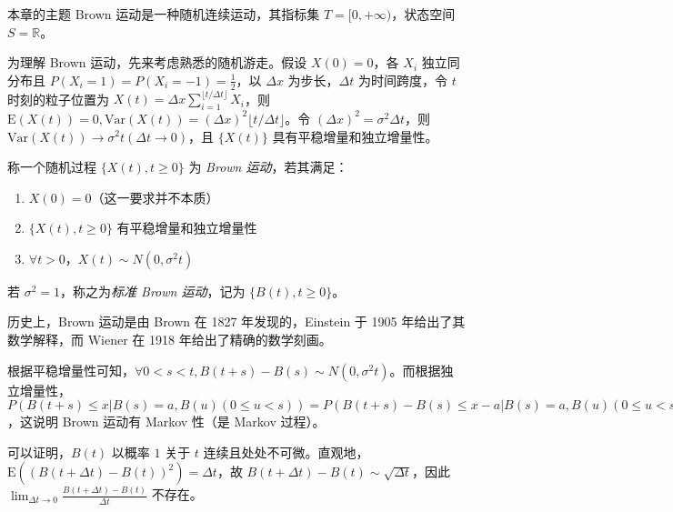 \documentclass[../main.tex]{subfiles}
\begin{document}
本章的主题 Brown 运动是一种随机连续运动，其指标集 $T=[0,+\infty)$，状态空间 $S=\mathbb R$。

为理解 Brown 运动，先来考虑熟悉的随机游走。假设 $X(0)=0$，各 $X_i$ 独立同分布且 $P(X_i=1)=P(X_i=-1)=\frac12$，以 $\Delta x$ 为步长，$\Delta t$ 为时间跨度，令 $t$ 时刻的粒子位置为 $X(t)=\Delta x\sum_{i=1}^{\lfloor t/\Delta t\rfloor}X_i$，则 $\mathrm E(X(t))=0,\mathrm{Var}(X(t))=(\Delta x)^2\lfloor t/\Delta t\rfloor$。令 $(\Delta x)^2=\sigma^2\Delta t$，则 $\mathrm{Var}(X(t))\rightarrow \sigma^2t(\Delta t\rightarrow0)$，且 $\{X(t)\}$ 具有平稳增量和独立增量性。

\begin{definition}\label{def:8.1.1}
    称一个随机过程 $\{X(t),t\geq 0\}$ 为 \emph{Brown 运动}，若其满足：
    \begin{enumerate}
        \item $X(0)=0$（这一要求并不本质）
        \item $\{X(t),t\geq 0\}$ 有平稳增量和独立增量性
        \item $\forall t>0$，$X(t)\sim N(0,\sigma^2t)$
    \end{enumerate}
    若 $\sigma^2=1$，称之为\emph{标准 Brown 运动}，记为 $\{B(t),t\geq0\}$。
\end{definition}

历史上，Brown 运动是由 Brown 在 1827 年发现的，Einstein 于 1905 年给出了其数学解释，而 Wiener 在 1918 年给出了精确的数学刻画。

根据平稳增量性可知，$\forall0<s<t,B(t+s)-B(s)\sim N(0,\sigma^2t)$。而根据独立增量性，$P(B(t+s)\leq x|B(s)=a,B(u)(0\leq u<s))=P(B(t+s)-B(s)\leq x-a|B(s)=a,B(u)(0\leq u<s))=P(B(t+s)-B(s)\leq x-a)=P(B(t+s)\leq x|B(s)=a)$，这说明 Brown 运动有 Markov 性（是 Markov 过程）。

可以证明，$B(t)$ 以概率 $1$ 关于 $t$ 连续且处处不可微。直观地，$\mathrm E((B(t+\Delta t)-B(t))^2)=\Delta t$，故 $B(t+\Delta t)-B(t)\sim\sqrt{\Delta t}$，因此 $\lim_{\Delta t\rightarrow0}\frac{B(t+\Delta t)-B(t)}{\Delta t}$ 不存在。
\end{document}
